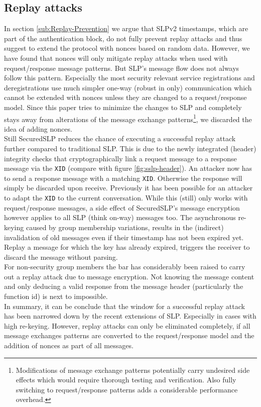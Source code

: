 \subsection{Replay attacks}
In section \ref{sub:Replay-Prevention} we argue that SLPv2 timestamps,
which are part of the authentication block, do not fully prevent replay
attacks and thus suggest to extend the protocol with nonces based on random data. However, we have found that nonces will only mitigate replay attacks when used with request/response message patterns. But SLP's message flow does not always follow this pattern. Especially the most security relevant service registrations and deregistrations use much simpler one-way (robust in only) communication which cannot be extended with nonces unless they are changed to a request/response model. Since this paper
tries to minimize the changes to SLP and completely stays away from
alterations of the message exchange patterns\footnote{Modifications of
message exchange patterns potentially carry undesired side effects which
would require thorough testing and verification. Also fully switching to
request/response patterns adds a considerable performance overhead.}, we
discarded the idea of adding nonces.\\
Still SecuredSLP reduces the chance of executing a successful replay
attack further compared to traditional SLP. This is due to the newly
integrated (header) integrity checks that cryptographically link a
request message to a response message via the \texttt{XID} (compare with
figure \ref{fig:sslp-header}). An attacker now has to send a response
message with a matching \texttt{XID}. Otherwise the response will simply
be discarded upon receive. Previously it has been possible for an
attacker to adapt the \texttt{XID} to the current conversation.  While
this (still) only works with request/response messages, a side effect of
SecuredSLP's message encryption however applies to all SLP (think
on-way) messages too. The asynchronous re-keying caused by group
membership variations, results in the (indirect) invalidation of old
messages even if their timestamp has not been expired yet. Replay a
message for which the key has already expired, triggers the receiver to
discard the message without parsing.\\
For non-security group members the bar has considerably been raised to
carry out a replay attack due to message encryption. Not knowing the
message content and only deducing a valid response from the message
header (particularly the function id) is next to impossible.\\
In summary, it can be conclude that the window for a successful replay
attack has been narrowed down by the recent extensions of SLP.
Especially in cases with high re-keying. However, replay attacks can
only be eliminated completely, if all message exchanges patterns are
converted to the request/response model and the addition of nonces as
part of all messages.


